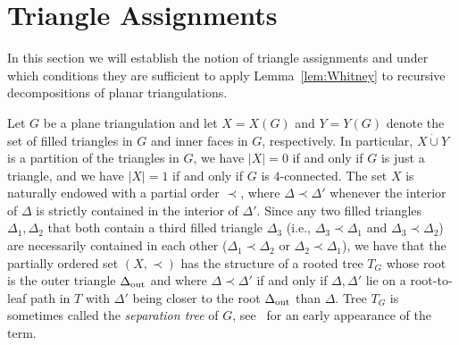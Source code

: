 \documentclass[a4paper,10pt]{article}
\theoremstyle{plain}
\begin{document}
\section{Triangle Assignments}\label{sec:triangle}

In this section we will establish the notion of triangle assignments and  under which conditions they are sufficient to apply Lemma~\ref{lem:Whitney} to recursive decompositions of planar triangulations. 

Let $G$ be a plane triangulation and let $X = X(G)$ and $Y = Y(G)$ denote the set of filled triangles in $G$ and inner faces in $G$, respectively.
In particular, $X \dot\cup Y$ is a partition of the triangles in $G$, we have $|X|=0$ if and only if $G$ is just a triangle, and we have $|X| = 1$ if and only if $G$ is $4$-connected.
The set $X$ is naturally endowed with a partial order $\prec$, where $\Delta \prec \Delta'$ whenever the interior of $\Delta$ is strictly contained in the interior of $\Delta'$.
Since any two filled triangles $\Delta_1,\Delta_2$ that both contain a third filled triangle $\Delta_3$ (i.e., $\Delta_3 \prec \Delta_1$ and $\Delta_3 \prec \Delta_2$) are necessarily contained in each other ($\Delta_1 \prec \Delta_2$ or $\Delta_2 \prec \Delta_1$), we have that the partially ordered set $(X,\prec)$ has the structure of a rooted tree $T_G$ whose root is the outer triangle $\Delta_{\rm out}$ and where $\Delta \prec \Delta'$ if and only if $\Delta,\Delta'$ lie on a root-to-leaf path in $T$ with $\Delta'$ being closer to the root $\Delta_{\rm out}$ than $\Delta$.
Tree $T_G$ is sometimes called the \emph{separation tree} of $G$, see~\cite{Sun-93} for an early appearance of the term.
\end{document}
